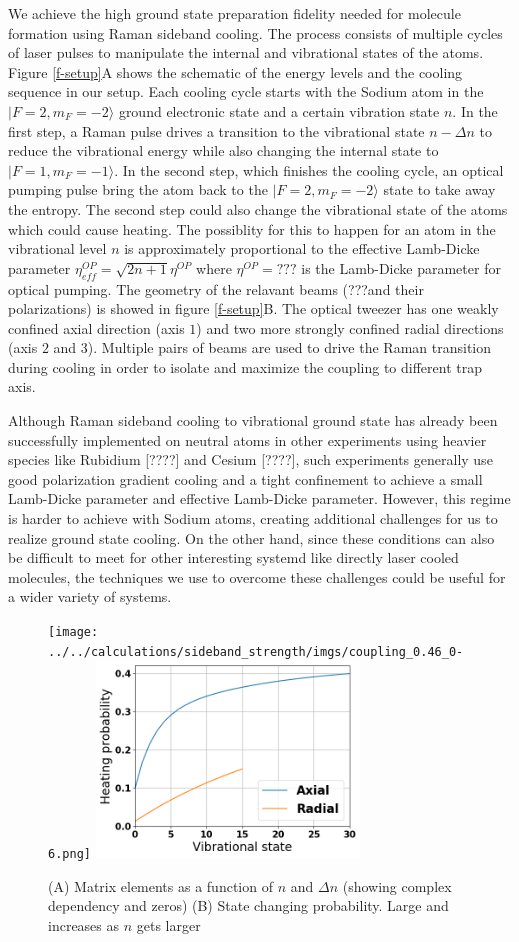 \documentclass[aps,prl,twocolumn,groupedaddress]{revtex4-1}
\begin{document}
We achieve the high ground state preparation fidelity needed for molecule formation
using Raman sideband cooling. The process consists of multiple cycles of laser pulses
to manipulate the internal and vibrational states of the atoms.
Figure \ref{f-setup}A shows the schematic of the energy levels and the cooling sequence
in our setup.
Each cooling cycle starts with the Sodium atom in the $|F=2, m_F=-2\rangle$
ground electronic state and a certain vibration state $n$.
In the first step, a Raman pulse drives a transition to the vibrational state $n-\Delta n$
to reduce the vibrational energy while also changing the internal state to $|F=1, m_F=-1\rangle$.
In the second step, which finishes the cooling cycle,
an optical pumping pulse bring the atom back to the $|F=2, m_F=-2\rangle$ state to take away
the entropy. The second step could also change the vibrational state of the atoms which
could cause heating. The possiblity for this to happen for an atom in the vibrational level $n$
is approximately proportional to the effective Lamb-Dicke parameter
$\eta^{OP}_{eff}=\sqrt{2n+1}\eta^{OP}$ where $\eta^{OP}=???$ is the Lamb-Dicke parameter for
optical pumping.
The geometry of the relavant beams (???and their polarizations) is showed in figure \ref{f-setup}B.
The optical tweezer has one weakly confined axial direction (axis $1$) and
two more strongly confined radial directions (axis $2$ and $3$).
Multiple pairs of beams are used to drive the Raman transition during cooling in order to
isolate and maximize the coupling to different trap axis.

Although Raman sideband cooling to vibrational ground state has already been successfully
implemented on neutral atoms in other experiments using heavier species like Rubidium [????]
and Cesium [????], such experiments generally use good polarization gradient cooling
and a tight confinement to achieve a small Lamb-Dicke parameter and effective Lamb-Dicke parameter.
However, this regime is harder to achieve with Sodium atoms, creating additional challenges for
us to realize ground state cooling. On the other hand, since these conditions can also be difficult
to meet for other interesting systemd like directly laser cooled molecules, the techniques we
use to overcome these challenges could be useful for a wider variety of systems.

\begin{figure}
  \texttt{[image: ../../calculations/sideband\_strength/imgs/coupling\_0.46\_0-6.png]}
  \includegraphics[width=7cm]{imgs/heating_op.png}
  \caption{(A) Matrix elements as a function of $n$ and $\Delta n$ (showing complex dependency and zeros) (B) State changing probability. Large and increases as $n$ gets larger
    \label{f-ld}}
\end{figure}
\end{document}
